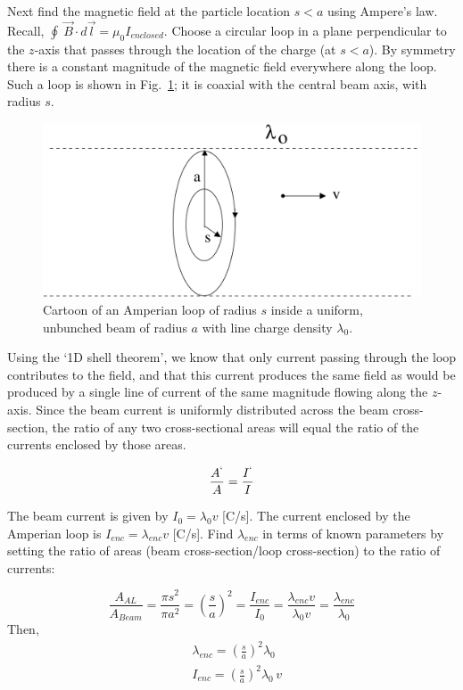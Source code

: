 \documentclass[12pt]{article}
\begin{document}
\begin{flushleft}
Next find the magnetic field at the particle location $s<a$ using Ampere's law.  Recall, $\oint \: \vec{B}\cdot d\vec{l} = \mu_{0}I_{enclosed}$.  Choose a circular loop in a plane perpendicular to the $z$-axis that passes through the location of the charge (at $s<a$).  By symmetry there is a constant magnitude of the magnetic field everywhere along the loop.  Such a loop is shown in Fig.~\ref{fig:ampere}; it is coaxial with the central beam axis, with radius $s$. 

\begin{figure}[h]
\centering
\includegraphics*[trim=0cm 0cm 0cm 0cm, clip=true, width=0.6\columnwidth]{amplaw_beam.pdf}
\caption{Cartoon of an Amperian loop of radius $s$ inside a uniform, unbunched beam of radius $a$ with line charge density $\lambda_{0}$.}
\label{fig:ampere}
\end{figure}

Using the `1D shell theorem', we know that only current passing through the loop contributes to the field, and that this current produces the same field as would be produced by a single line of current of the same magnitude flowing along the $z$-axis.   Since the beam current is uniformly distributed across the beam cross-section, the ratio of any two cross-sectional areas will equal the ratio of the currents enclosed by those areas.

\[
\frac{A^{`}}{A}=\frac{I^{`}}{I}
\]

The beam current is given by $I_{0} = \lambda_{0} v$ [C/s].  The current enclosed by the Amperian loop is $I_{enc} = \lambda_{enc} v$ [C/s].  Find $\lambda_{enc}$ in terms of known parameters by setting the ratio of areas (beam cross-section/loop cross-section) to the ratio of currents:

\[
\frac{A_{AL}}{A_{Beam}}=\frac{\pi s^{2}}{\pi a^{2}} = \left(\frac{s}{a}\right)^{2} =\frac{I_{enc}}{I_{0}} = 
\frac{ \lambda_{enc} v}{ \lambda_{0} v}  
= \frac{ \lambda_{enc} }{\lambda_{0}} 
\]
Then,
\begin{equation*}
\begin{aligned}
& \lambda_{enc} = \left(\frac{s}{a}\right)^{2}\lambda_{0} \\
& I_{enc} = \left(\frac{s}{a}\right)^{2}\lambda_{0} \,v
\end{aligned}
\end{equation*}


\end{flushleft}
\end{document}
